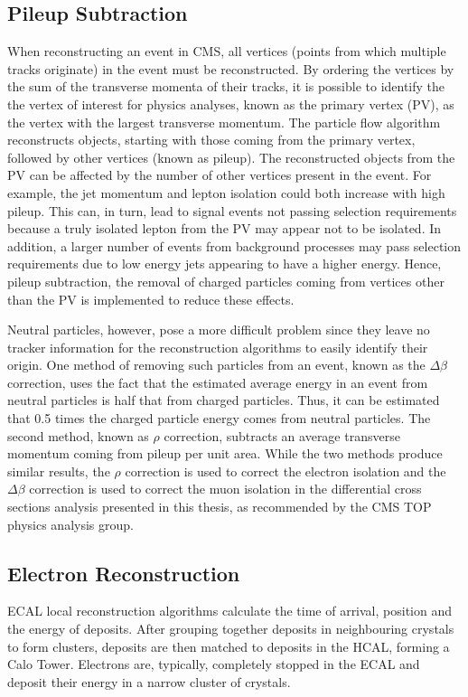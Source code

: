 \subsection{Pileup Subtraction}
\label{ss:pileup_subtraction}
When reconstructing an event in CMS, all vertices (points from which multiple tracks originate) in the event
must be reconstructed. By ordering the vertices by the sum of the transverse momenta of their tracks, it is
possible to identify the the vertex of interest for physics analyses, known as the primary vertex (PV), as the
vertex with the largest transverse momentum. The particle flow algorithm reconstructs objects, starting with
those coming from the primary vertex, followed by other vertices (known as pileup). The reconstructed objects
from the PV can be affected by the number of other vertices present in the event. For example, the jet
momentum and lepton isolation could both increase with high pileup. This can, in turn, lead to signal events
not passing selection requirements because a truly isolated lepton from the PV may appear not to be isolated.
In addition, a larger number of events from background processes may pass selection requirements due to low
energy jets appearing to have a higher energy. Hence, pileup subtraction, the removal of charged particles
coming from vertices other than the PV is implemented to reduce these effects.

Neutral particles, however, pose a more difficult problem since they leave no tracker information for the
reconstruction algorithms to easily identify their origin. One method of removing such particles from an
event, known as the $\Delta\beta$ correction, uses the fact that the estimated average energy in an event from
neutral particles is half that from charged particles. Thus, it can be estimated that 0.5 times the charged
particle energy comes from neutral particles. The second method, known as $\rho$ correction, subtracts an
average transverse momentum coming from pileup per unit area. While the two methods produce similar results,
the $\rho$ correction is used to correct the electron isolation and the $\Delta\beta$ correction is used to
correct the muon isolation in the differential cross sections analysis presented in this thesis, as
recommended by the CMS TOP physics analysis group.

\subsection{Electron Reconstruction}
\label{ss:electron_reconstruction}
ECAL local reconstruction algorithms calculate the time of arrival, position and the energy of deposits. After
grouping together deposits in neighbouring crystals to form clusters, deposits are then matched to deposits in
the HCAL, forming a Calo Tower. Electrons are, typically, completely stopped in the ECAL and deposit their
energy in a narrow cluster of crystals.

